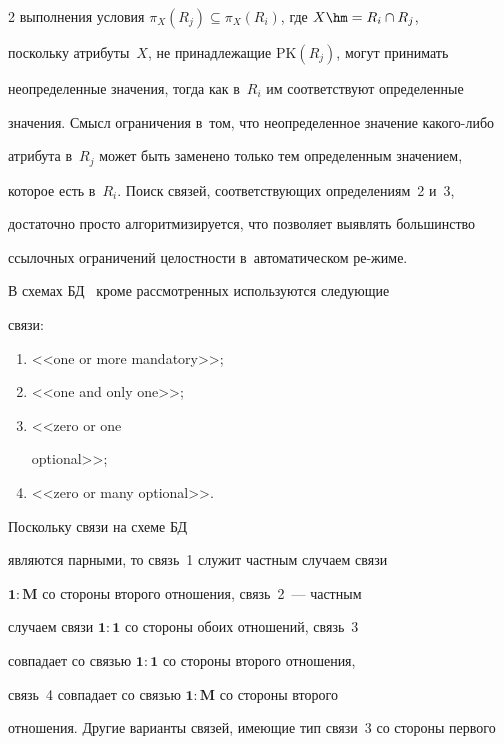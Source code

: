 \begin{multicols}{2}
выполнения условия $\pi_X(R_j)\subseteq \pi_X(R_i)$, где $X\hm= R_i \cap R_j$,

поскольку атрибуты~$X$, не принадлежащие $\mathrm{PK}(R_j)$, могут принимать

неопределенные значения, тогда как в~$R_i$ им соответствуют определенные

значения. Смысл ограничения в~том, что неопределенное значение ка\-ко\-го-ли\-бо

атрибута в~$R_j$ может быть заменено только тем определенным значением,

которое есть в~$R_i$. Поиск связей, соответствующих определениям~2 и~3,

достаточно просто алгоритмизируется, что позволяет выявлять большинство

ссылочных ограничений целостности в~автоматическом ре-\linebreak жиме.



  В схемах БД~\cite{8-z} кроме рассмотренных используются следующие

связи:

\begin{enumerate}[(1)]

\item <<one or more mandatory>>; 

\item <<one and only one>>; 

\item <<zero or one

optional>>; 

\item <<zero or many optional>>. 

\end{enumerate}



Поскольку связи на схеме БД

являются парными, то связь~1 служит частным случаем связи

$\mathbf{1}:\mathbf{M}$ со стороны второго отношения, связь~2~--- частным

случаем связи $\mathbf{1}:\mathbf{1}$ со стороны обоих отношений, связь~3

совпадает со связью $\mathbf{1}:\mathbf{1}$ со стороны второго отношения,

связь~4 совпадает со связью $\mathbf{1}:\mathbf{M}$ со стороны второго

отношения. Другие варианты связей, имеющие тип связи~3 со стороны первого


\end{multicols}
